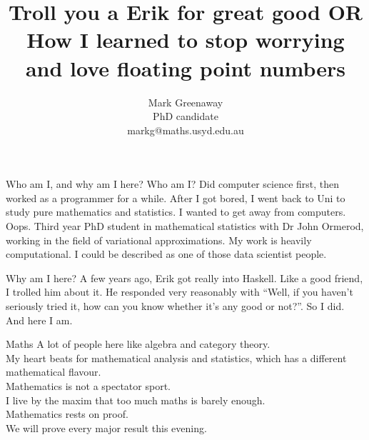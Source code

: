 \documentclass{beamer}
\title{Troll you a Erik for great good OR How I learned to stop worrying and love floating point numbers}
\author{Mark Greenaway \\ PhD candidate \\ markg@maths.usyd.edu.au}
\begin{document}
\begin{frame}
\maketitle
\end{frame}

\begin{frame}{Who am I, and why am I here?}
Who am I?
Did computer science first, then worked as a programmer for a while.
After I got bored, I went back to Uni to study pure mathematics and statistics. I wanted to get away from
computers. Oops.
Third year PhD student in mathematical statistics with Dr John Ormerod, working in the field of variational
approximations. My work is heavily computational.
I could be described as one of those data scientist people.

Why am I here?
A few years ago, Erik got really into Haskell.
Like a good friend, I trolled him about it.
He responded very reasonably with ``Well, if you haven't seriously tried it, how can you know whether it's
any good or not?''.
So I did. And here I am.
\end{frame}

\begin{frame}{Maths}
A lot of people here like algebra and category theory. \\
My heart beats for mathematical analysis and statistics, which has a different mathematical flavour. \\
Mathematics is not a spectator sport. \\
I live by the maxim that too much maths is barely enough. \\
Mathematics rests on proof. \\
We will prove every major result this evening. \\
\end{frame}




\end{document}
